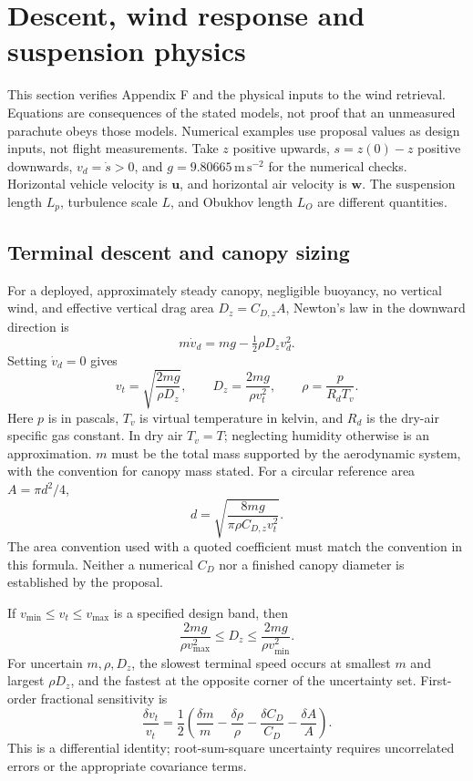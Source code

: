\section{Descent, wind response and suspension physics}
\label{sec:physics}

This section verifies Appendix F and the physical inputs to the wind
retrieval. Equations are consequences of the stated models, not proof that
an unmeasured parachute obeys those models. Numerical examples use proposal
values as design inputs, not flight measurements. Take $z$ positive upwards,
$s=z(0)-z$ positive downwards, $v_d=\dot s>0$, and
$g=9.80665\,\mathrm{m\,s^{-2}}$ for the numerical checks. Horizontal vehicle
velocity is $\boldsymbol u$, and horizontal air velocity is $\boldsymbol w$.
The suspension length $L_p$, turbulence scale $L$, and Obukhov length $L_O$
are different quantities.

\subsection{Terminal descent and canopy sizing}

For a deployed, approximately steady canopy, negligible buoyancy, no
vertical wind, and effective vertical drag area $D_z=C_{D,z}A$, Newton's
law in the downward direction is
\begin{equation}
 m\dot v_d=mg-\tfrac12\rho D_z v_d^2.
\end{equation}
Setting $\dot v_d=0$ gives
\begin{equation}
 v_t=\sqrt{\frac{2mg}{\rho D_z}},\qquad
 D_z=\frac{2mg}{\rho v_t^2},\qquad
 \rho=\frac{p}{R_dT_v}.
\end{equation}
Here $p$ is in pascals, $T_v$ is virtual temperature in kelvin, and
$R_d$ is the dry-air specific gas constant. In dry air $T_v=T$; neglecting
humidity otherwise is an approximation. $m$ must be the total mass supported
by the aerodynamic system, with the convention for canopy mass stated.
For a circular reference area $A=\pi d^2/4$,
\begin{equation}
 d=\sqrt{\frac{8mg}{\pi\rho C_{D,z}v_t^2}}.
\end{equation}
The area convention used with a quoted coefficient must match the convention
in this formula. Neither a numerical $C_D$ nor a finished canopy diameter is
established by the proposal.

If $v_{\min}\leq v_t\leq v_{\max}$ is a specified design band, then
\begin{equation}
 \frac{2mg}{\rho v_{\max}^2}\leq D_z
 \leq\frac{2mg}{\rho v_{\min}^2}.
\end{equation}
For uncertain $m,\rho,D_z$, the slowest terminal speed occurs at smallest
$m$ and largest $\rho D_z$, and the fastest at the opposite corner of the
uncertainty set. First-order fractional sensitivity is
\begin{equation}
 \frac{\delta v_t}{v_t}
 =\frac12\left(\frac{\delta m}{m}-\frac{\delta\rho}{\rho}
 -\frac{\delta C_D}{C_D}-\frac{\delta A}{A}\right).
\end{equation}
This is a differential identity; root-sum-square uncertainty requires
uncorrelated errors or the appropriate covariance terms.


